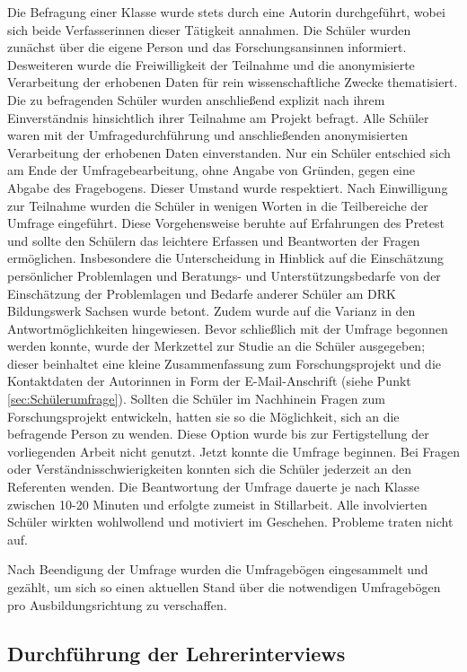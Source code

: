 Die Befragung einer Klasse wurde stets durch eine Autorin durchgeführt, wobei sich beide Verfasserinnen dieser Tätigkeit annahmen.
Die Schüler wurden zunächst über die eigene Person und das Forschungsansinnen informiert. Desweiteren wurde die Freiwilligkeit der Teilnahme und die anonymisierte Verarbeitung der erhobenen Daten für rein wissenschaftliche Zwecke thematisiert. Die zu befragenden Schüler wurden anschließend explizit nach ihrem Einverständnis hinsichtlich ihrer Teilnahme am Projekt befragt. Alle Schüler waren mit der Umfragedurchführung und anschließenden anonymisierten Verarbeitung der erhobenen Daten einverstanden. Nur ein Schüler entschied sich am Ende der Umfragebearbeitung, ohne Angabe von Gründen, gegen eine Abgabe des Fragebogens. Dieser Umstand wurde respektiert. Nach Einwilligung zur Teilnahme wurden die Schüler in wenigen Worten in die Teilbereiche der Umfrage eingeführt. Diese Vorgehensweise beruhte auf Erfahrungen des Pretest und sollte den Schülern das leichtere Erfassen und Beantworten der Fragen ermöglichen. Insbesondere die Unterscheidung in Hinblick auf die Einschätzung persönlicher Problemlagen und Beratungs- und Unterstützungsbedarfe von der Einschätzung der Problemlagen und Bedarfe anderer Schüler am DRK Bildungswerk Sachsen wurde betont. Zudem wurde auf die Varianz in den Antwortmöglichkeiten hingewiesen. Bevor schließlich mit der Umfrage begonnen werden konnte, wurde der Merkzettel zur Studie an die Schüler ausgegeben; dieser beinhaltet eine kleine Zusammenfassung zum Forschungsprojekt und die Kontaktdaten der Autorinnen in Form der E-Mail-Anschrift (siehe Punkt \ref{sec:Schülerumfrage}). Sollten die Schüler im Nachhinein Fragen zum Forschungsprojekt entwickeln, hatten sie so die Möglichkeit, sich an die befragende Person zu wenden. Diese Option wurde bis zur Fertigstellung der vorliegenden Arbeit nicht genutzt. Jetzt konnte die Umfrage beginnen. Bei Fragen oder Verständnisschwierigkeiten konnten sich die Schüler jederzeit an den Referenten wenden. Die Beantwortung der Umfrage dauerte je nach Klasse zwischen 10-20 Minuten und erfolgte zumeist in Stillarbeit. Alle involvierten Schüler wirkten wohlwollend und motiviert im Geschehen. Probleme traten nicht auf.

Nach Beendigung der Umfrage wurden die Umfragebögen eingesammelt und gezählt, um sich so einen aktuellen Stand über die notwendigen Umfragebögen pro Ausbildungsrichtung zu verschaffen.

\subsection{Durchführung der Lehrerinterviews}
\label{sec:DurchführungDerLehrerinterviews}


